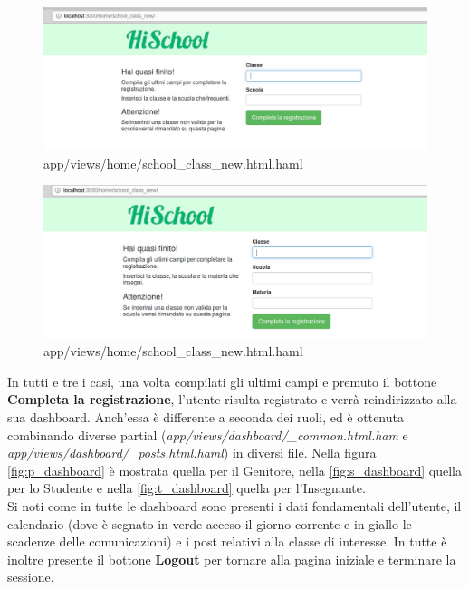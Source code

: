 \documentclass[Lau, binding=0.6cm, oneside]{sapthesis}
\begin{document}
\begin{figure}[H]
	\centering
	\includegraphics[width=1\linewidth]{images/school_s_form} 
	\caption{app/views/home/school\_class\_new.html.haml}
	\label{fig:school_s_form}
\end{figure}

\begin{figure}[H]
	\centering
	\includegraphics[width=1\linewidth]{images/school_t_form} 
	\caption{app/views/home/school\_class\_new.html.haml}
	\label{fig:school_t_form}
\end{figure}

In tutti e tre i casi, una volta compilati gli ultimi campi e premuto il bottone \textbf{Completa la registrazione}, l'utente risulta registrato e verrà reindirizzato alla sua dashboard. Anch'essa è differente a seconda dei ruoli, ed è ottenuta combinando diverse partial (\textit{app/views/dashboard/\_common.html.ham} e \textit{app/views/dashboard/\_posts.html.haml}) in diversi file. Nella figura \ref{fig:p_dashboard} è mostrata quella per il Genitore, nella \ref{fig:s_dashboard} quella per lo Studente e nella \ref{fig:t_dashboard} quella per l'Insegnante.\\
Si noti come in tutte le dashboard sono presenti i dati fondamentali dell'utente, il calendario (dove è segnato in verde acceso il giorno corrente e in giallo le scadenze delle comunicazioni) e i post relativi alla classe di interesse. In tutte è inoltre presente il bottone \textbf{Logout} per tornare alla pagina iniziale e terminare la sessione.
\end{document}
